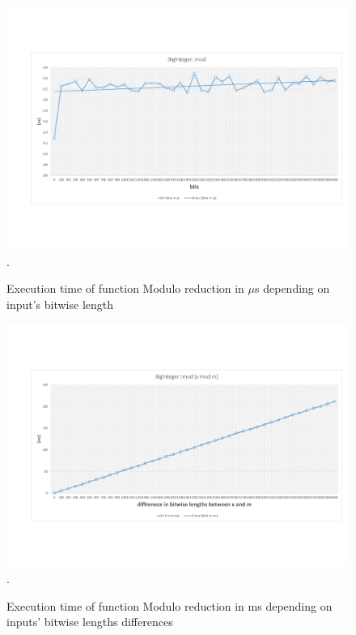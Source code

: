 \documentclass[oneside,openright,12pt,final,en]{mgr}
\begin{document}
\begin{figure}[H]
	\centering
	\includegraphics[width=\textwidth,trim={0.5cm 2.8cm 0.4cm 2.8cm},clip]{mod.pdf}.
	\caption{Execution time of function Modulo reduction in $\mu$s depending on input's bitwise length}
	\label{fig:mod}
\end{figure}

\begin{figure}[H]
	\centering
	\includegraphics[width=\textwidth,trim={0.5cm 2.8cm 0.4cm 2.8cm},clip]{mod_diff.pdf}.
	\caption{Execution time of function Modulo reduction in ms depending on inputs' bitwise lengths differences}
	\label{fig:mod_diff}
\end{figure}
\end{document}
